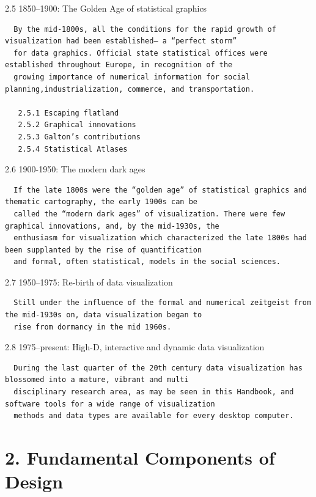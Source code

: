 \documentclass[]{book}
\theoremstyle{definition}
\theoremstyle{definition}
\theoremstyle{definition}
\theoremstyle{remark}
\begin{document}
\begin{enumerate}
  2.5 1850--1900: The Golden Age of statistical graphics

\begin{verbatim}
  By the mid-1800s, all the conditions for the rapid growth of visualization had been established— a “perfect storm”
  for data graphics. Official state statistical offices were established throughout Europe, in recognition of the
  growing importance of numerical information for social planning,industrialization, commerce, and transportation. 

   2.5.1 Escaping flatland
   2.5.2 Graphical innovations
   2.5.3 Galton’s contributions
   2.5.4 Statistical Atlases
\end{verbatim}

  2.6 1900-1950: The modern dark ages

\begin{verbatim}
  If the late 1800s were the “golden age” of statistical graphics and thematic cartography, the early 1900s can be
  called the “modern dark ages” of visualization. There were few graphical innovations, and, by the mid-1930s, the
  enthusiasm for visualization which characterized the late 1800s had been supplanted by the rise of quantification
  and formal, often statistical, models in the social sciences.
\end{verbatim}

  2.7 1950--1975: Re-birth of data visualization

\begin{verbatim}
  Still under the influence of the formal and numerical zeitgeist from the mid-1930s on, data visualization began to
  rise from dormancy in the mid 1960s. 
\end{verbatim}

  2.8 1975--present: High-D, interactive and dynamic data visualization

\begin{verbatim}
  During the last quarter of the 20th century data visualization has blossomed into a mature, vibrant and multi
  disciplinary research area, as may be seen in this Handbook, and software tools for a wide range of visualization
  methods and data types are available for every desktop computer.
\end{verbatim}
\end{enumerate}

\section{2. Fundamental Components of
Design}\label{fundamental-components-of-design}
\end{document}
